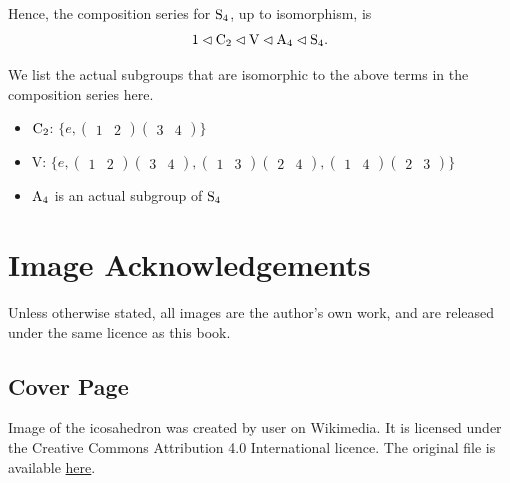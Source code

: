 \begin{enumerate}
    Hence, the composition series for $\mathrm{S}_{4}$, up to isomorphism, is
    \[
        1 \lhd \mathrm{C}_{2} \lhd \mathrm{V} \lhd \mathrm{A}_{4} \lhd \mathrm{S}_{4}.   
    \]
    \begin{remark}
        We list the actual subgroups that are isomorphic to the above terms in the composition series here.
        \begin{itemize}
            \item $\mathrm{C}_{2}$: $\{e, \begin{pmatrix}1&2\end{pmatrix}\begin{pmatrix}3&4\end{pmatrix}\}$
            \item V: $\{e, \begin{pmatrix}1&2\end{pmatrix}\begin{pmatrix}3&4\end{pmatrix}, \begin{pmatrix}1&3\end{pmatrix}\begin{pmatrix}2&4\end{pmatrix}, \begin{pmatrix}1&4\end{pmatrix}\begin{pmatrix}2&3\end{pmatrix}\}$
            \item $\mathrm{A}_{4}$ is an actual subgroup of $\mathrm{S}_{4}$
        \end{itemize}
    \end{remark}
\end{enumerate}

\chapter{Image Acknowledgements}
Unless otherwise stated, all images are the author's own work, and are released under the same licence as this book.

\section{Cover Page}
Image of the icosahedron was created by user  on Wikimedia. It is licensed under the Creative Commons Attribution 4.0 International licence. The original file is available \href{https://commons.wikimedia.org/wiki/File:Icosahedron_with_colored_vertices.png}{here}.

